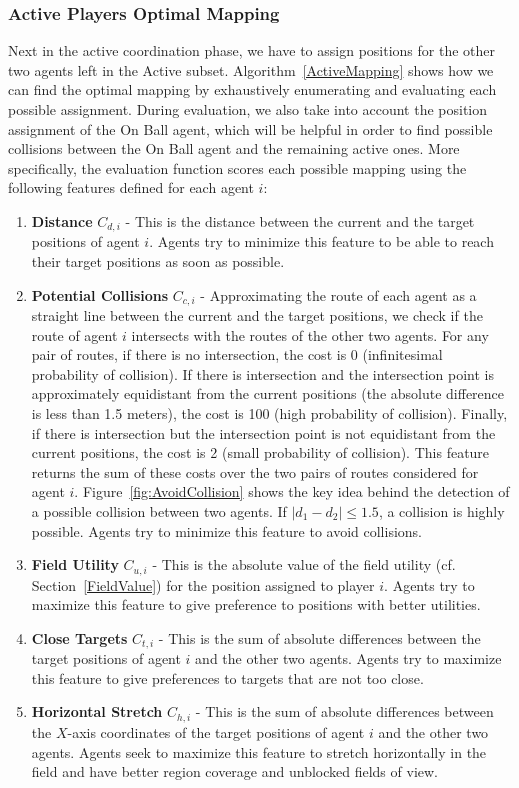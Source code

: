 \subsubsection*{Active Players Optimal Mapping}
Next in the active coordination phase, we have to assign positions for the other two agents  left in the Active subset. Algorithm~\ref{ActiveMapping} shows how we can find the optimal mapping by exhaustively enumerating and evaluating each possible assignment. During evaluation, we also take into account the position assignment of the On Ball agent, which will be helpful in order to find possible collisions between the On Ball agent and the remaining active ones. More specifically, the evaluation function scores each possible mapping using the following features defined for each agent $i$: 

\begin{enumerate}
\item \textbf{Distance} $C_{d,i}$ - This is the distance between the current and the target positions of agent $i$. Agents try to minimize this feature to be able to reach their target positions as soon as possible. 
\item \textbf{Potential Collisions} $C_{c,i}$ - Approximating the route of each agent as a straight line between the current and the target positions, we check if the route of agent $i$ intersects with the routes of the other two agents. For any pair of routes, if there is no intersection, the cost is 0 (infinitesimal probability of collision). If there is intersection and the intersection point is approximately equidistant from the current positions (the absolute difference is less than 1.5 meters), the cost is 100 (high probability of collision). Finally, if there is intersection but the intersection point is not equidistant from the current positions, the cost is 2 (small probability of collision). This feature returns the sum of these costs over the two pairs of routes considered for agent $i$. Figure~\ref{fig:AvoidCollision} shows the key idea behind the detection of a possible collision between two agents. If $|d_{1}-d_{2}|\le 1.5$, a collision is highly possible. Agents try to minimize this feature to avoid collisions.
\item \textbf{Field Utility} $C_{u,i}$ - This is the absolute value of the field utility (cf. Section~\ref{FieldValue}) for the position assigned to player $i$. Agents try to maximize this feature to give preference to positions with better utilities.
\item \textbf{Close Targets} $C_{t,i}$ - This is the sum of absolute differences between the target positions of agent $i$ and the other two agents. Agents try to maximize this feature to give preferences to targets that are not too close.
\item \textbf{Horizontal Stretch} $C_{h,i}$ - This is the sum of absolute differences between the $X$-axis coordinates of the target positions of agent $i$ and the other two agents. Agents seek to maximize this feature to stretch horizontally in the field and have better region coverage and unblocked fields of view.  
\end{enumerate}
